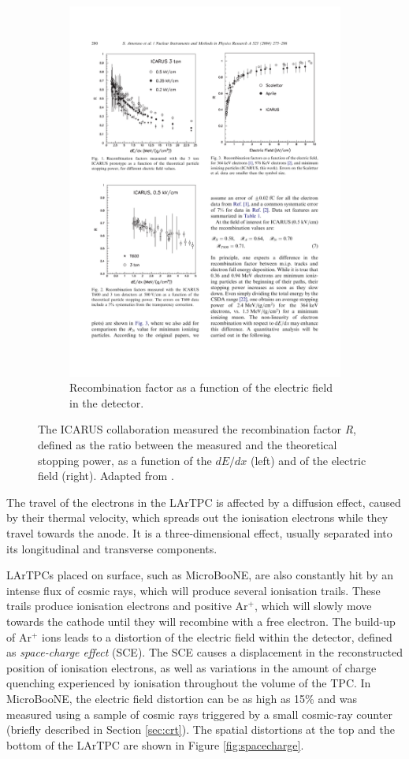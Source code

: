 \begin{figure}[htbp]
\begin{subfigure}{0.48\textwidth}
\begin{center}
        \includegraphics[height=0.9\linewidth]{figures/icarus2.pdf}
        \caption{Recombination factor as a function of the electric field in the detector.}
    \end{center}
  \end{subfigure}
    \caption{The ICARUS collaboration measured the recombination factor \emph{R}, defined as the ratio between the measured and the theoretical stopping power, as a function of the $dE/dx$ (left) and of the electric field (right). Adapted from \cite{Amoruso:2004dy}.}\label{fig:recombination}
\end{figure}

The travel of the electrons in the LArTPC is affected by a diffusion effect, caused by their thermal velocity, which spreads out the ionisation electrons while they travel towards the anode. It is a three-dimensional effect, usually separated into its longitudinal and transverse components. 

LArTPCs placed on surface, such as MicroBooNE, are also constantly hit by an intense flux of cosmic rays, which will produce several ionisation trails. These trails produce ionisation electrons and positive Ar$^+$, which will slowly move towards the cathode until they will recombine with a free electron. The build-up of Ar$^+$ ions leads to a distortion of the electric
field within the detector, defined as \emph{space-charge effect} (SCE). The SCE causes a displacement in the reconstructed position of ionisation electrons, as well as variations in the amount of charge quenching experienced by ionisation throughout the volume of the TPC. In MicroBooNE, the electric field distortion can be as high as 15\% and was measured using a sample of cosmic rays triggered by a small cosmic-ray counter (briefly described in Section \ref{sec:crt}). The spatial distortions at the top and the bottom of the LArTPC are shown in Figure \ref{fig:spacecharge}.


